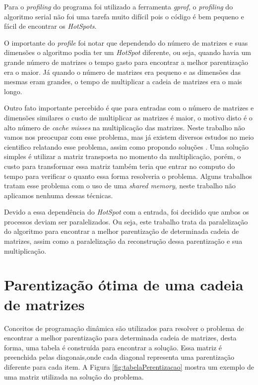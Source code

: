 \documentclass[12pt,openright,oneside,chapter=TITLE,section=TITLE,
    brazil]{utfpr-pg}
\begin{document}
Para o \emph{profiling} do programa foi utilizado a ferramenta \emph{gprof}, o \emph{profiling} do algoritmo serial não foi uma tarefa muito difícil pois o código é bem pequeno e fácil de encontrar os \emph{HotSpots}. 

O importante do \emph{profile} foi notar que dependendo do número de matrizes e suas dimensões o algoritmo podia ter um \emph{HotSpot} diferente, ou seja, quando havia um grande número de matrizes o tempo gasto para encontrar a melhor parentização era o maior. Já quando o número de matrizes era pequeno e as dimensões das mesmas eram grandes, o tempo de multiplicar a cadeia de matrizes era o mais longo.

Outro fato importante percebido é que para entradas com o número de matrizes e dimensões  similares o custo de multiplicar as matrizes é maior, o motivo disto é o alto número de \emph{cache misses} na multiplicação das matrizes. Neste trabalho não vamos nos preocupar com esse problema, mas já existem diversos estudos no meio cientifico relatando esse problema, assim como propondo soluções \cite{lam1991cache}. Uma solução simples é utilizar a matriz transposta no momento da multiplicação, porém, o custo para transformar essa matriz também teria que entrar no computo do tempo para verificar o quanto essa forma resolveria o problema. Alguns trabalhos tratam esse problema com o uso de uma \emph{shared memory}, neste trabalho não aplicamos nenhuma dessas técnicas.

Devido a essa dependência do \emph{HotSpot} com a entrada, foi decidido que ambos os processos deviam ser paralelizados. Ou seja, este trabalho trata da paralelização do algoritmo para encontrar a melhor parentização de determinada cadeia de matrizes, assim como a paralelização da reconstrução dessa parentização e sua multiplicação.

\section{Parentização ótima de uma cadeia de matrizes}
\vspace{-0.7cm}

Conceitos de programação dinâmica são utilizados para resolver o problema de encontrar a melhor parentização para determinada cadeia de matrizes, desta forma, uma tabela é construída para encontrar a solução. Essa matriz é preenchida pelas diagonais,onde cada diagonal representa uma parentização diferente para cada item. A Figura \ref{fig:tabelaPerentizacao} mostra um exemplo de uma matriz utilizada na solução do problema.
\end{document}
